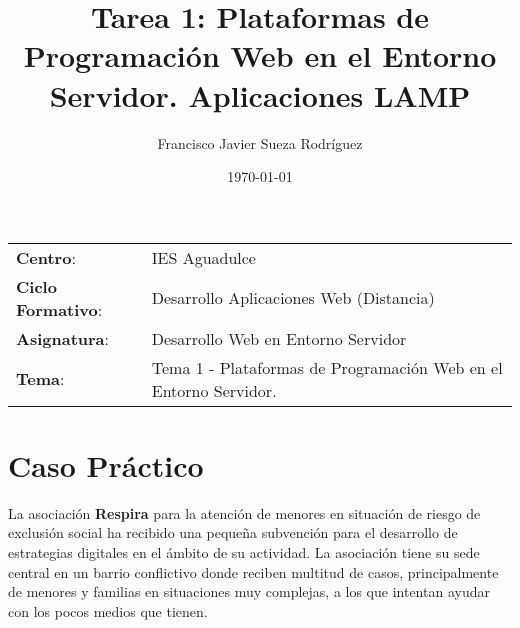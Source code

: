 


\title{
\vspace{10ex}
\normalfont \normalsize
\huge \textbf{Tarea 1: Plataformas de Programación Web en el Entorno Servidor. Aplicaciones LAMP}
}
\author{Francisco Javier Sueza Rodríguez}
\date{\normalsize\today}



\maketitle

\thispagestyle{empty}

\vspace{65ex}

\begin{center}
    \begin{tabular}{l l}
        \textbf{Centro}: & IES Aguadulce \\
        \textbf{Ciclo Formativo}: & Desarrollo Aplicaciones Web (Distancia)\\
        \textbf{Asignatura}: & Desarrollo Web en Entorno Servidor\\
        \textbf{Tema}: & Tema 1 -  Plataformas de Programación Web en el Entorno Servidor.\\
    \end{tabular}
\end{center}

\newpage

\section{Caso Práctico}
La asociación \textbf{Respira} para la atención de menores en situación de riesgo de exclusión social ha recibido una pequeña subvención para el desarrollo de estrategias digitales en el ámbito de su actividad. La asociación tiene su sede central en un barrio conflictivo donde reciben multitud de casos, principalmente de menores y familias en situaciones muy complejas, a los que intentan ayudar con los pocos medios que tienen.

